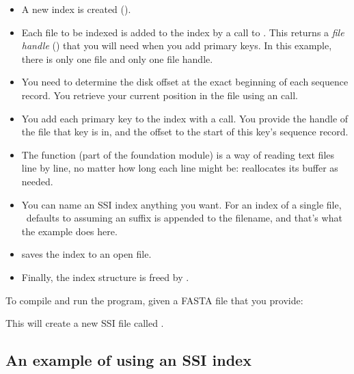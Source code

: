 \begin{itemize}
\item A new index is created ().

\item Each file to be indexed is added to the index by a call to
      . This returns a \emph{file handle}
      () that you will need when you add primary keys. In
      this example, there is only one file and only one file handle.

\item You need to determine the disk offset at the exact beginning of
      each sequence record. You retrieve your current position in the
      file using an  call.

\item You add each primary key to the index with a
       call. You provide the handle of the
      file that key is in, and the offset to the start of this key's
      sequence record.

\item The  function (part of the  
      foundation module) is a way of reading text files line by line, 
      no matter how long each line might be: 
      reallocates its buffer as needed.

\item You can name an SSI index anything you want. For an index of a
      single file, \Easel\ defaults to assuming an  suffix
      is appended to the filename, and that's what the example does
      here.

\item {} saves the index to an open file.

\item Finally, the index structure is freed by
      .
\end{itemize}

To compile and run the program, given a FASTA file  that
you provide:

\begin{cchunk}
\end{cchunk}

This will create a new SSI file called .

\subsection{An example of using an SSI index}

